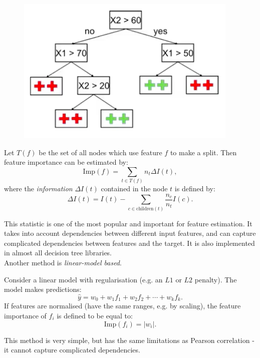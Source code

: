 \begin{figure}[H]
\centering
\includegraphics[scale=0.4]{featuretree.png}
\end{figure}

\begin{framedef}
Let $T(f)$ be the set of all nodes which use feature $f$ to make a split. Then feature importance can be estimated by:
\begin{equation*}
\textrm{Imp}(f) = \sum_{t \in T(f)} n_t \Delta I(t),
\end{equation*}
where the \textit{information} $\Delta I(t)$ contained in the node $t$ is defined by:
\begin{equation*}
\Delta I (t) = I(t) - \sum_{c \in \textrm{children}(t)} \frac{n_c}{n_t} I(c).
\end{equation*}
\end{framedef}
This statistic is one of the most popular and important for feature estimation. It takes into account dependencies between different input features, and can capture complicated dependencies between features and the target. It is also implemented in almost all decision tree libraries.\\

Another method is \textit{linear-model based}.
\begin{framedef}
Consider a linear model with regularisation (e.g. an $L1$ or $L2$ penalty). The model makes predictions:
\begin{equation*}
\hat{y} = w_0 + w_1 f_1 + w_2 f_2 + \cdots + w_k f_k.
\end{equation*}
If features are normalised (have the same ranges, e.g. by scaling), the feature importance of $f_i$ is defined to be equal to:
\begin{equation*}
\textrm{Imp}(f_i) = |w_i|.
\end{equation*}
\end{framedef}
This method is very simple, but has the same limitations as Pearson correlation - it cannot capture complicated dependencies.




